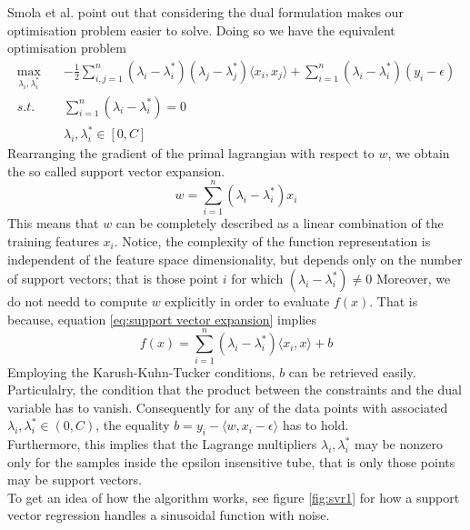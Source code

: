 Smola et al. \cite{smola2004tutorial} point out that considering the dual formulation makes our optimisation problem easier to solve. Doing so we have the equivalent optimisation problem
\begin{equation}
    \begin{aligned}
        \max_{\lambda_i, \lambda_i^*} \quad& -\frac{1}{2}\sum\limits_{i,j=1}^n(\lambda_i-\lambda_i^*)(\lambda_j-\lambda_j^*)\langle x_i,x_j\rangle +\sum\limits_{i=1}^n(\lambda_i-\lambda_i^*)(y_i-\epsilon)
        \\
        s.t. \quad& \sum\limits_{i=1}^n(\lambda_i-\lambda_i^*)=0
        \\
        \quad& \lambda_i, \lambda_i^* \in [0, C]
    \end{aligned}
\end{equation}
Rearranging the gradient of the primal lagrangian with respect to $w$, we obtain the so called support vector expansion.
\begin{equation}\label{eq:support vector expansion}
    w=\sum\limits_{i=1}^n(\lambda_i-\lambda_i^*)x_i
\end{equation}
This means that $w$ can be completely described as a linear combination of the training features $x_i$.
Notice, the complexity of the function representation is independent of the feature space dimensionality, but depends only on the number of support vectors; that is those point $i$ for which $(\lambda_i-\lambda_i^*)\neq 0$
Moreover, we do not needd to compute $w$ explicitly in order to evaluate $f(x)$.
That is because, equation \ref{eq:support vector expansion} implies
\begin{equation}
    f(x)=\sum\limits_{i=1}^n(\lambda_i-\lambda_i^*)\langle x_i, x\rangle +b
\end{equation}
Employing the Karush-Kuhn-Tucker conditions, $b$ can be retrieved easily. Particulalry, the condition that the product between the constraints and the dual variable has to vanish.
Consequently for any of the data points with associated $\lambda_i, \lambda^*_i \in (0,C)$, the equality $b=y_i-\langle w, x_i-\epsilon\rangle$ has to hold.
\\
Furthermore, this implies that the Lagrange multipliers $\lambda_i, \lambda_i^*$ may be nonzero only for the samples inside the epsilon insensitive tube, that is only those points may be support vectors. 
\\
To get an idea of how the algorithm works, see figure \ref{fig:svr1} for how a support vector regression handles a sinusoidal function with noise.
\\
